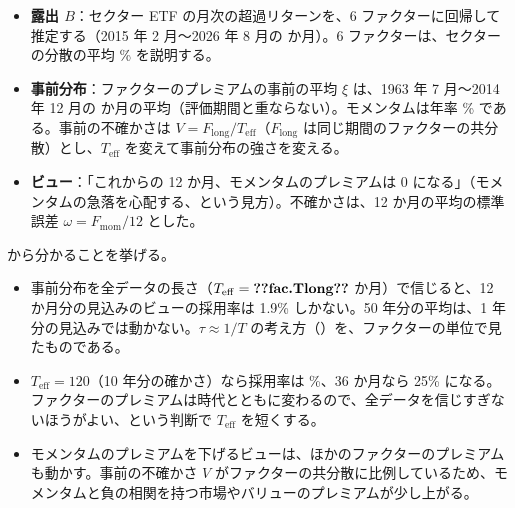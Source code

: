 \begin{itemize}
\item \textbf{露出 $B$}：セクター ETF の月次の超過リターンを、6 ファクターに回帰して推定する（2015 年 2 月〜2026 年 8 月の  か月）。6 ファクターは、セクターの分散の平均 \% を説明する。
\item \textbf{事前分布}：ファクターのプレミアムの事前の平均 $\xi$ は、1963 年 7 月〜2014 年 12 月の  か月の平均（評価期間と重ならない）。モメンタムは年率 \% である。事前の不確かさは $V=F_{\mathrm{long}}/T_{\mathrm{eff}}$（$F_{\mathrm{long}}$ は同じ期間のファクターの共分散）とし、$T_{\mathrm{eff}}$ を変えて事前分布の強さを変える。
\item \textbf{ビュー}：「これからの 12 か月、モメンタムのプレミアムは 0 になる」（モメンタムの急落を心配する、という見方）。不確かさは、12 か月の平均の標準誤差 $\omega=F_{\mathrm{mom}}/12$ とした。
\end{itemize}

\begin{table}[htbp]
\centering
\caption{事前分布の強さ $T_{\mathrm{eff}}$ と、モメンタムへのビューの効き方（年率 \%）。右の 5 列は、ほかのファクターのプレミアムの事後の変化。$T_{\mathrm{eff}}=\V{fac.Tlong}$ は 1963〜2014 年の全データを信じる場合。}
\label{tab:fac-prior}
\end{table}

 から分かることを挙げる。

\begin{itemize}
\item 事前分布を全データの長さ（$T_{\mathrm{eff}}=\V{fac.Tlong}$ か月）で信じると、12 か月分の見込みのビューの採用率は 1.9\% しかない。50 年分の平均は、1 年分の見込みでは動かない。$\tau\approx1/T$ の考え方（）を、ファクターの単位で見たものである。
\item $T_{\mathrm{eff}}=120$（10 年分の確かさ）なら採用率は \%、36 か月なら 25\% になる。ファクターのプレミアムは時代とともに変わるので、全データを信じすぎないほうがよい、という判断で $T_{\mathrm{eff}}$ を短くする。
\item モメンタムのプレミアムを下げるビューは、ほかのファクターのプレミアムも動かす。事前の不確かさ $V$ がファクターの共分散に比例しているため、モメンタムと負の相関を持つ市場やバリューのプレミアムが少し上がる。
\end{itemize}

\begin{table}[htbp]
\centering
\caption{$T_{\mathrm{eff}}=120$ のときの、セクターの期待超過リターン（年率 \%）。事前は $B\xi$、事後は $B\mu_f^{\mathrm{post}}$（ファクターで説明できない部分は 0 とした）。}
\label{tab:fac-assets}
\end{table}

